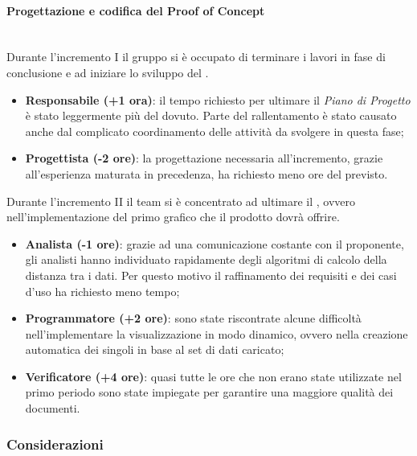 \paragraph{Progettazione e codifica del Proof of Concept} \mbox{}\\

Durante l'incremento I il gruppo si è occupato di terminare i lavori in fase di conclusione e ad iniziare lo sviluppo del .

\begin{itemize}
\item \textbf{Responsabile (+1 ora)}: il tempo richiesto per ultimare il \textit{Piano di Progetto} è stato leggermente più del dovuto. Parte del rallentamento è stato causato anche dal complicato coordinamento delle attività da svolgere in questa fase;

\item \textbf{Progettista (-2 ore)}: la progettazione necessaria all'incremento, grazie all'esperienza maturata in precedenza, ha richiesto meno ore del previsto.

\end{itemize}

Durante l'incremento II il team si è concentrato ad ultimare il , ovvero nell'implementazione del primo grafico che il prodotto dovrà offrire.

\begin{itemize}
\item \textbf{Analista (-1 ore)}: grazie ad una comunicazione costante con il proponente, gli analisti hanno individuato rapidamente degli algoritmi di calcolo della distanza tra i dati. Per questo motivo il raffinamento dei requisiti e dei casi d'uso ha richiesto meno tempo;

\item \textbf{Programmatore (+2 ore)}: sono state riscontrate alcune difficoltà nell'implementare la visualizzazione  in modo dinamico, ovvero nella creazione automatica dei singoli  in base al set di dati caricato;

\item \textbf{Verificatore (+4 ore)}: quasi tutte le ore che non erano state utilizzate nel primo periodo sono state impiegate per garantire una maggiore qualità dei documenti.
\end{itemize}

\subsubsection{Considerazioni}

